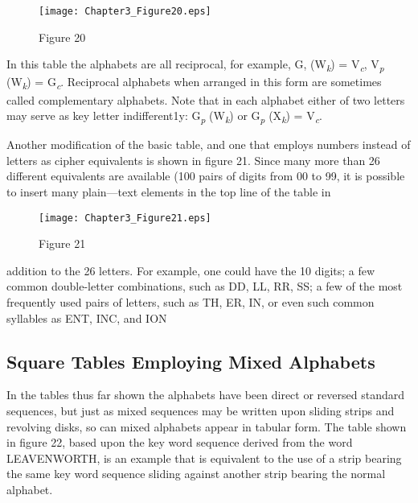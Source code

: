 \begin{figure}[h]
 \centering
 \texttt{[image: Chapter3\_Figure20.eps]}
 \caption{Figure 20}
\end{figure}

In this table the alphabets are all reciprocal, for example, G, (W\textsubscript{\textit{k}}) = V\textsubscript{\textit{c}},
V\textsubscript{\textit{p}} (W\textsubscript{\textit{k}}) = G\textsubscript{\textit{c}}. Reciprocal alphabets when arranged in this form are
sometimes called complementary alphabets. Note that in each alphabet
either of two letters may serve as key letter indifferent1y: G\textsubscript{\textit{p}} (W\textsubscript{\textit{k}}) or
G\textsubscript{\textit{p}} (X\textsubscript{\textit{k}}) = V\textsubscript{\textit{c}}.

\mypara Another modiﬁcation of the basic table, and one that employs numbers instead of letters as cipher equivalents is shown in ﬁgure 21. Since
many more than 26 different equivalents are available (100 pairs of
digits from 00 to 99, it is possible to insert many plain—text elements in the top line of the table in
 
 \clearpage
 \begin{landscape}
\begin{figure}[h]
 \centering
 \texttt{[image: Chapter3\_Figure21.eps]}
 \caption{Figure 21}
\end{figure}
 \end{landscape}
\clearpage
 

addition to the 26 letters. For example, one
could have the 10 digits; a few common double-letter combinations, such
as DD, LL, RR, SS; a few of the most frequently used pairs of letters,
such as TH, ER, IN, or even such common syllables as ENT, INC, and
ION

\subsection{Square Tables Employing Mixed Alphabets}

\mypara In the tables thus far shown the alphabets have been direct or
reversed standard sequences, but just as mixed sequences may be written
upon sliding strips and revolving disks, so can mixed alphabets appear in
tabular form. The table shown in ﬁgure 22, based upon the key word
sequence derived from the word LEAVENWORTH, is an example that
is equivalent to the use of a strip bearing the same key word sequence
sliding against another strip bearing the normal alphabet.

